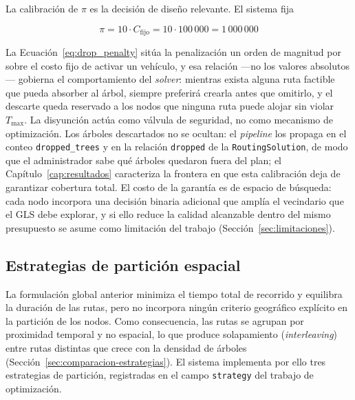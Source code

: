 La calibración de $\pi$ es la decisión de diseño relevante. El sistema fija

\begin{equation}
  \pi = 10 \cdot C_{\text{fijo}} = 10 \cdot 100\,000 = 1\,000\,000
  \label{eq:drop_penalty}
\end{equation}

La Ecuación~\ref{eq:drop_penalty} sitúa la penalización un orden de magnitud por sobre el costo
fijo de activar un vehículo, y esa relación ---no los valores absolutos--- gobierna el
comportamiento del \textit{solver}: mientras exista alguna ruta factible que pueda absorber al
árbol, siempre preferirá crearla antes que omitirlo, y el descarte queda reservado a los nodos que
ninguna ruta puede alojar sin violar $T_{\max}$. La disyunción actúa como válvula de seguridad, no
como mecanismo de optimización. Los árboles descartados no se ocultan: el \textit{pipeline} los
propaga en el conteo \texttt{dropped\_trees} y en la relación \texttt{dropped} de la
\texttt{RoutingSolution}, de modo que el administrador sabe qué árboles quedaron fuera del plan; el
Capítulo~\ref{cap:resultados} caracteriza la frontera en que esta calibración deja de garantizar
cobertura total. El costo de la garantía es de espacio de búsqueda: cada nodo incorpora una
decisión binaria adicional que amplía el vecindario que el GLS debe explorar, y si ello reduce la
calidad alcanzable dentro del mismo presupuesto se asume como limitación del trabajo
(Sección~\ref{sec:limitaciones}).

\subsection{Estrategias de partición espacial}
\label{sec:estrategias}

La formulación global anterior minimiza el tiempo total de recorrido y equilibra la duración de las
rutas, pero no incorpora ningún criterio geográfico explícito en la partición de los nodos. Como
consecuencia, las rutas se agrupan por proximidad temporal y no espacial, lo que produce
solapamiento (\textit{interleaving}) entre rutas distintas que crece con la densidad de árboles
(Sección~\ref{sec:comparacion-estrategias}). El sistema implementa por ello tres estrategias de
partición, registradas en el campo \texttt{strategy} del trabajo de optimización.

